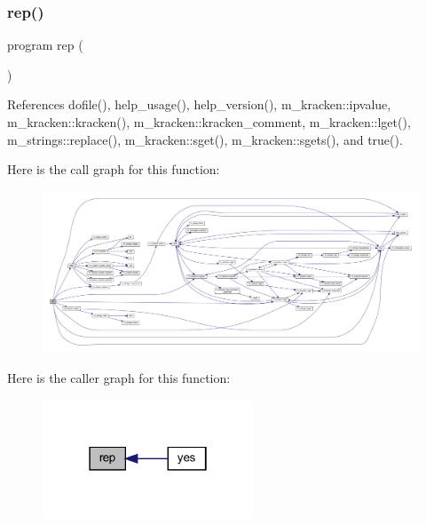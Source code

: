 \subsubsection{\texorpdfstring{rep()}{rep()}}
{\footnotesize\ttfamily program rep (\begin{DoxyParamCaption}{ }\end{DoxyParamCaption})}



References dofile(), help\+\_\+usage(), help\+\_\+version(), m\+\_\+kracken\+::ipvalue, m\+\_\+kracken\+::kracken(), m\+\_\+kracken\+::kracken\+\_\+comment, m\+\_\+kracken\+::lget(), m\+\_\+strings\+::replace(), m\+\_\+kracken\+::sget(), m\+\_\+kracken\+::sgets(), and true().

Here is the call graph for this function\+:
\nopagebreak
\begin{figure}[H]
\begin{center}
\leavevmode
\includegraphics[width=350pt]{rep_8f90_a6e3f64c6bb01cd2bdc33472e0505a863_cgraph}
\end{center}
\end{figure}
Here is the caller graph for this function\+:
\nopagebreak
\begin{figure}[H]
\begin{center}
\leavevmode
\includegraphics[width=178pt]{rep_8f90_a6e3f64c6bb01cd2bdc33472e0505a863_icgraph}
\end{center}
\end{figure}
